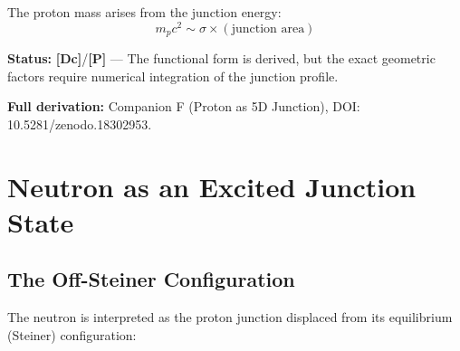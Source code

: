 \documentclass[11pt,a4paper]{article}
\newcommand{\tagP}{\textcolor{red!70!black}{\textbf{[P]}}}
\newcommand{\tagDc}{\textcolor{blue!70!black}{\textbf{[Dc]}}}
\begin{document}
\begin{center}
\end{center}

The proton mass arises from the junction energy:
\begin{equation}
    m_p c^2 \sim \sigma \times (\text{junction area})
\end{equation}

\textbf{Status:} \tagDc{}/\tagP{} --- The functional form is derived, but the exact geometric factors require numerical integration of the junction profile.

\textbf{Full derivation:} Companion F (Proton as 5D Junction), DOI: 10.5281/zenodo.18302953.

\section{Neutron as an Excited Junction State}
\label{sec:neutron_junction}

\subsection{The Off-Steiner Configuration}

The neutron is interpreted as the proton junction displaced from its equilibrium (Steiner) configuration:
\end{document}
